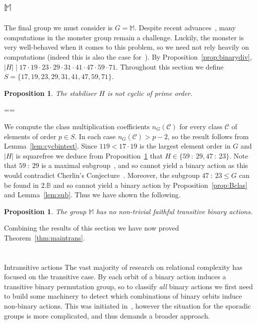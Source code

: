 \documentclass[11pt, a4paper]{amsart}
\makeatletter
\newcommand\C{\mathcal{C}}
\def\cn{\mathord{{\!\:{:}\:\!}}}
\let\oldsection\section
\newcommand\boldsection[1]{\oldsection{\bf #1}}
\newcommand\starsection[1]{\oldsection*{\bf #1}}
\renewcommand\section{\@ifstar\starsection\boldsection}
\newtheorem{prop}[thm]{Proposition}
\renewcommand{\proofname}{Proof}
\renewenvironment{proof}[1][\proofname]{\par
  \pushQED{\qed}  \normalfont \partopsep=\z@skip \topsep=\z@skip
  \trivlist
  \item[\hskip\labelsep
        \scshape
    #1\@addpunct{.}]\ignorespaces
}{  \popQED\endtrivlist\@endpefalse
}
\makeatother
\begin{document}
\subsection{$\mathbb{M}$} The final group we must consider is $G=\mathbb{M}$. Despite recent advances~\cite{Sey24}, many computations in the monster group remain a challenge. Luckily, the monster is very well-behaved when it comes to this problem, so we need not rely heavily on computations (indeed this is also the case for~\cite{CDP}). By Proposition~\ref{prop:binarydiv}, $|H| \mid 17\cdot19\cdot23\cdot29\cdot31\cdot41\cdot47\cdot59\cdot71$. Throughout this section we define $S=\{17,19,23,29,31,41,47,59,71\}$.
\begin{prop}\label{prop:Mnocyc}
    The stabiliser $H$ is not cyclic of prime order. 
\end{prop}
\begin{proof}
    We compute the class multiplication coefficients $n_G(\mathcal{C})$ for every class $\C$ of elements of order $p\in S$. In each case $n_G(\mathcal{C})>p-2$, so the result follows from Lemma~\ref{lem:cycbintest}.
\end{proof}
Since $119<17\cdot 19$ is the largest element order in $G$ and $|H|$ is squarefree we deduce from Proposition~\ref{prop:Mnocyc} that $H\in\{59\cn29,47\cn 23\}$. Note that $59\cn 29$ is a maximal subgroup~\cite{DLP25}, and so cannot yield a binary action as this would contradict Cherlin's Conjecture~\cite{GLS22}. Moreover, the subgroup $47\cn 23\leq G$ can be found in $2.\mathbb{B}$ and so cannot yield a binary action by Proposition~\ref{prop:Bclas} and Lemma~\ref{lem:sub}. Thus we have shown the following.
  \begin{prop}\label{prop:Mclas}
    The group $\mathbb{M}$ has no non-trivial faithful transitive binary actions.
\end{prop}
 
Combining the results of this section we have now proved Theorem~\ref{thm:maintrans}.
\section{Intransitive actions}\label{sec:intrans}
The vast majority of research on relational complexity has focused on the transitive case. By \cite[Lemma 2.5]{GG23} each orbit of a binary action induces a transitive binary permutation group, so to classify \emph{all} binary actions we first need to build some machinery to detect which combinations of binary orbits induce non-binary actions. This was initiated in~\cite{GG23}, however the situation for the sporadic groups is more complicated, and thus demands a broader approach.
\end{document}
